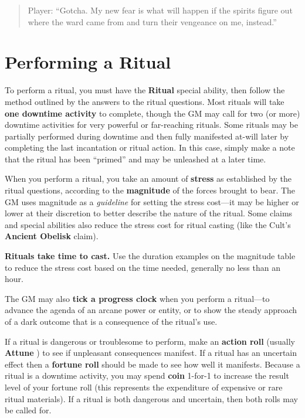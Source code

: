 \documentclass[11pt,fleqn,a5paper]{book}
\newcommand{\gameterm}[1]{\textbf{#1}}
\begin{document}
\begin{quote}
	Player: “Gotcha. My new fear is what will happen if the spirits figure out where the ward came from and turn their vengeance on me, instead.”
\end{quote} 

\section{Performing a Ritual}

To perform a ritual, you must have the \gameterm{Ritual}  special ability, then follow the method outlined by the answers to the ritual questions. Most rituals will take \textbf{one downtime activity} to complete, though the GM may call for two (or more) downtime activities for very powerful or far-reaching rituals. Some rituals may be partially performed during downtime and then fully manifested at-will later by completing the last incantation or ritual action. In this case, simply make a note that the ritual has been “primed” and may be unleashed at a later time.

When you perform a ritual, you take an amount of \textbf{stress} as established by the ritual questions, according to the \textbf{magnitude} of the forces brought to bear. The GM uses magnitude as a \emph{guideline} for setting the stress cost---it may be higher or lower at their discretion to better describe the nature of the ritual. Some claims and special abilities also reduce the stress cost for ritual casting (like the Cult’s \textbf{Ancient Obelisk} claim).

\textbf{Rituals take time to cast.} Use the duration examples on the magnitude table to reduce the stress cost based on the time needed, generally no less than an hour.

The GM may also \textbf{tick a progress clock} when you perform a ritual---to advance the agenda of an arcane power or entity, or to show the steady approach of a dark outcome that is a consequence of the ritual’s use.

If a ritual is dangerous or troublesome to perform, make an \textbf{action roll} (usually \gameterm{Attune} ) to see if unpleasant consequences manifest. If a ritual has an uncertain effect then a \textbf{fortune roll} should be made to see how well it manifests. Because a ritual is a downtime activity, you may spend \gameterm{coin}  1-for-1 to increase the result level of your fortune roll (this represents the expenditure of expensive or rare ritual materials). If a ritual is both dangerous and uncertain, then both rolls may be called for.
\end{document}
